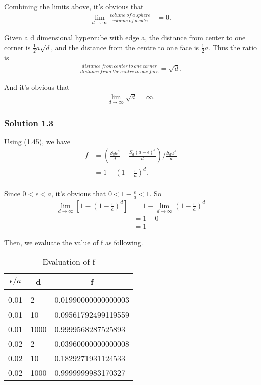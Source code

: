 \documentclass{article} %
\begin{document}
Combining the limits above, it's obvious that
\begin{align*}
    \lim_{d \to \infty} \frac{volume\ of\ a\ sphere}{volume\ of\ a\ cube} &= 0.
\end{align*} 

Given a d dimensional hypercube with edge a, the distance from center to one corner is $\frac{1}{2}a\sqrt{d}$, and the distance from
the centre to one face is $\frac{1}{2}a$. Thus the ratio is
\begin{align*}
    \frac{distance\ from\ center\ to\ one\ corner}{distance\ from\ the\ centre\ to\ one\ face} = \sqrt{d}.
\end{align*} 

And it's obvious that
\begin{align*}
    \lim_{d \to \infty} \sqrt{d} = \infty.
\end{align*} 

\subsubsection{Solution 1.3}

Using (1.45), we have
\begin{align*}
    f &= (\frac{S_d a^d}{d} - \frac{S_d (a-\epsilon)^d}{d} ) / \frac{S_d a^d}{d} \\
    &=  1 - (1 - \frac{\epsilon}{a})^d. \\
\end{align*}

Since $0 < \epsilon < a$, it's obvious that $0 < 1 - \frac{\epsilon}{a} < 1$.
So
\begin{align*}
    \lim_{d \to \infty} [1 - (1 - \frac{\epsilon}{a}) ^d] &= 1 - \lim_{d \to \infty}(1 - \frac{\epsilon}{a}) ^d \\
    &= 1 - 0 \\
    &= 1
\end{align*} 

Then, we evaluate the value of f as following.

\begin{table}[h]
\caption{Evaluation of f}
\label{evaluation-of-f}
\begin{center}
\begin{tabular}{lll}
\multicolumn{1}{c}{\bf $\epsilon/a$}  &\multicolumn{1}{c}{\bf d} &\multicolumn{1}{c}{\bf f}
\\ \hline \\
0.01 & 2 & 0.01990000000000003 \\
0.01 & 10 & 0.09561792499119559 \\
0.01 & 1000 & 0.9999568287525893 \\
0.02 & 2 & 0.03960000000000008 \\
0.02 & 10 & 0.1829271931124533 \\
0.02 & 1000 & 0.9999999983170327 \\
\end{tabular}
\end{center}
\end{table}
\end{document}
